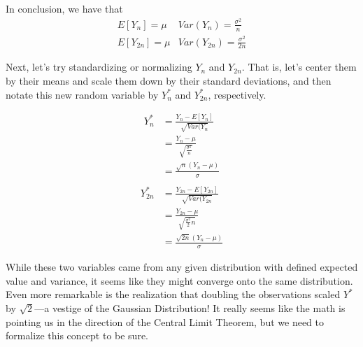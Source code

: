 \documentclass{article}
\begin{document}
In conclusion, we have that
\begin{equation*}
    \begin{array}{cc}
        E[Y_{n}]=\mu & Var(Y_{n})=\frac{\sigma^{2}}{n} \\
        E[Y_{2n}]=\mu & Var(Y_{2n})=\frac{\sigma^{2}}{2n}
    \end{array}
\end{equation*}

Next, let's try standardizing or normalizing $Y_{n}$ and $Y_{2n}$. That is, let's center them by their means and scale them down by their standard deviations, and then notate this new random variable by $Y^{*}_{n}$ and $Y^{*}_{2n}$, respectively.

\begin{multicols}{2}
\begin{align*}
    Y^{*}_{n}&=\frac{Y_{n}-E[Y_{n}]}{\sqrt{Var(Y_{n}}}\\
    &=\frac{Y_{n}-\mu}{\sqrt{\frac{\sigma^{2}}{n}}}\\
    &=\frac{\sqrt{n}(Y_{n}-\mu)}{\sigma}
\end{align*}
\columnbreak
\begin{align*}
 \\
    Y^{*}_{2n}&=\frac{Y_{2n}-E[Y_{2n}]}{\sqrt{Var(Y_{2n}}}\\
    &=\frac{Y_{2n}-\mu}{\sqrt{\frac{\sigma^{2}}2{n}}}\\
    &=\frac{\sqrt{2n}(Y_{n}-\mu)}{\sigma}
\end{align*}
\end{multicols}

While these two variables came from any given distribution with defined expected value and variance, it seems like they might converge onto the same distribution. Even more remarkable is the realization that doubling the observations scaled $Y^{*}$ by $\sqrt2$---a vestige of the Gaussian Distribution! It really seems like the math is pointing us in the direction of the Central Limit Theorem, but we need to formalize this concept to be sure.
\end{document}
